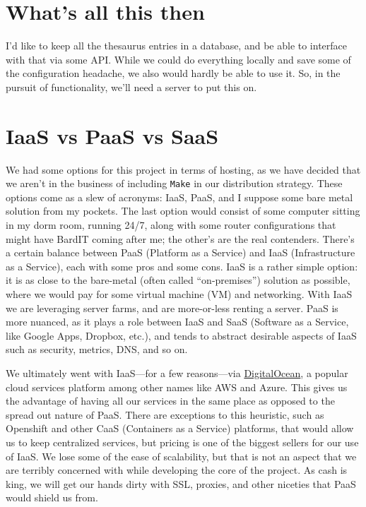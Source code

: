 \documentclass[11pt, twoside, reqno]{book}
\begin{document}
\section{What's all this then}


I'd like to keep all the thesaurus entries in a database, and be able to interface with that via some API. While we could do everything locally and save some of the configuration headache, we also would hardly be able to use it. So, in the pursuit of functionality, we'll need a server to put this on.

\section{IaaS vs PaaS vs SaaS}

We had some options for this project in terms of hosting, as we have decided that we aren't in the business of including \texttt{Make} in our distribution strategy. These options come as a slew of acronyms: IaaS, PaaS, and I suppose some bare metal solution from my pockets. The last option would consist of some computer sitting in my dorm room, running 24/7, along with some router configurations that might have BardIT coming after me; the other's are the real contenders. There's a certain balance between PaaS (Platform as a Service) and IaaS (Infrastructure as a Service), each with some pros and some cons. IaaS is a rather simple option: it is as close to the bare-metal (often called ``on-premises'') solution as possible, where we would pay for some virtual machine (VM) and networking. With IaaS we are leveraging server farms, and are more-or-less renting a server. PaaS is more nuanced, as it plays a role between IaaS and SaaS (Software as a Service, like Google Apps, Dropbox, etc.), and tends to abstract desirable aspects of IaaS such as security, metrics, DNS, and so on.

We ultimately went with IaaS—for a few reasons—via \href{https://www.digitalocean.com}{DigitalOcean}, a popular cloud services platform among other names like AWS and Azure. This gives us the advantage of having all our services in the same place as opposed to the spread out nature of PaaS. There are exceptions to this heuristic, such as Openshift and other CaaS (Containers as a Service) platforms, that would allow us to keep centralized services, but pricing is one of the biggest sellers for our use of IaaS. We lose some of the ease of scalability, but that is not an aspect that we are terribly concerned with while developing the core of the project. As cash is king, we will get our hands dirty with SSL, proxies, and other niceties that PaaS would shield us from.
\end{document}
